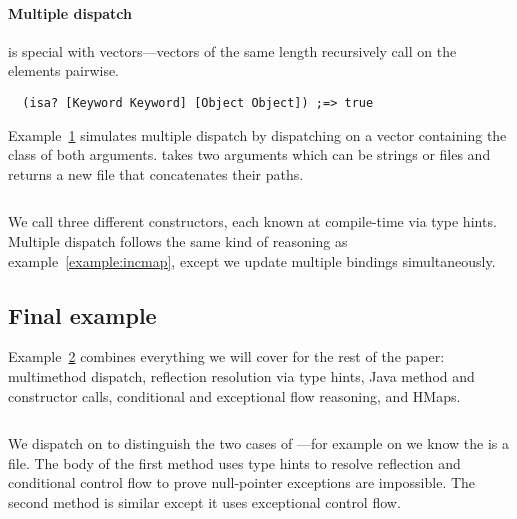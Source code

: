 \paragraph{Multiple dispatch}  is special with vectors---vectors of the
same length recursively call  on the elements pairwise.
\begin{verbatim}
  (isa? [Keyword Keyword] [Object Object]) ;=> true
\end{verbatim}

Example~\ref{example:multidispatch}
simulates multiple dispatch by dispatching on
a vector containing the class of both arguments. 
takes two arguments which can be strings or files and returns
a new file that concatenates their paths.

\begin{figure}
\begin{exmp}
\inputminted[firstline=6,lastline=22]{clojure}{code/demo/src/demo/eg7.clj}
\label{example:multidispatch}
\end{exmp}
\end{figure}

We call three different  constructors, each known at compile-time
via type hints.
Multiple dispatch follows the same kind of reasoning as example~\ref{example:incmap},
except we update multiple bindings simultaneously.

\subsection{Final example}

Example~\ref{example:final}
combines everything we will cover for the rest of the paper:
multimethod dispatch, reflection resolution via type hints, Java method
and constructor calls, conditional and exceptional flow reasoning,
and HMaps. 

\begin{figure}
\begin{exmp}
\inputminted[firstline=6,lastline=20]{clojure}{code/demo/src/demo/eg8.clj}
\label{example:final}
\end{exmp}
\end{figure}

We dispatch on  to distinguish the two cases of ---for example on 
we know the  is a file.
The body of the first method uses type hints to resolve reflection
and conditional control flow to prove null-pointer exceptions are impossible.
The second method is similar except it uses exceptional control flow.





